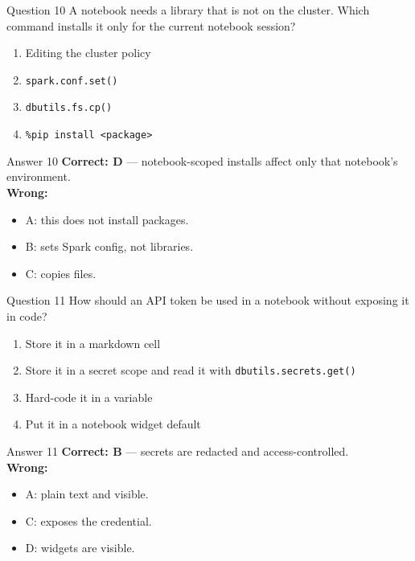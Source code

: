 \documentclass[aspectratio=169,11pt]{beamer}
\begin{document}
	\begin{frame}{Question 10}
		A notebook needs a library that is not on the cluster. Which command installs it only for the current notebook session?
		\begin{enumerate}[label=\Alph*.]
			\item Editing the cluster policy
			\item \texttt{spark.conf.set()}
			\item \texttt{dbutils.fs.cp()}
			\item \texttt{\%pip install <package>}
		\end{enumerate}
	\end{frame}
	\begin{frame}{Answer 10}
		\textbf{Correct: D} --- notebook-scoped installs affect only that notebook's environment.\\
		\vspace{0.5em}
		\textbf{Wrong:}
		\begin{itemize}
			\item A: this does not install packages.
			\item B: sets Spark config, not libraries.
			\item C: copies files.
		\end{itemize}
	\end{frame}
	
	\begin{frame}{Question 11}
		How should an API token be used in a notebook without exposing it in code?
		\begin{enumerate}[label=\Alph*.]
			\item Store it in a markdown cell
			\item Store it in a secret scope and read it with \texttt{dbutils.secrets.get()}
			\item Hard-code it in a variable
			\item Put it in a notebook widget default
		\end{enumerate}
	\end{frame}
	\begin{frame}{Answer 11}
		\textbf{Correct: B} --- secrets are redacted and access-controlled.\\
		\vspace{0.5em}
		\textbf{Wrong:}
		\begin{itemize}
			\item A: plain text and visible.
			\item C: exposes the credential.
			\item D: widgets are visible.
		\end{itemize}
	\end{frame}
	
\end{document}
